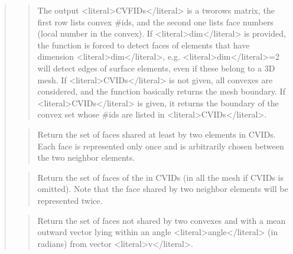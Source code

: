 \documentclass[a4paper,11pt,english]{sphinxmanual}
\begin{document}
\begin{quote}
\begin{quote}
\sphinxAtStartPar
The output \textless{}literal\textgreater{}CVFIDs\textless{}/literal\textgreater{} is a two\sphinxhyphen{}rows matrix, the first row lists
convex \#ids, and the second one lists face numbers (local number
in the convex). If \textless{}literal\textgreater{}dim\textless{}/literal\textgreater{} is provided, the function is forced to
detect faces of elements that have dimension \textless{}literal\textgreater{}dim\textless{}/literal\textgreater{}, e.g. \textless{}literal\textgreater{}dim\textless{}/literal\textgreater{}=2 will
detect edges of surface elements, even if these belong to a 3D mesh.
If \textless{}literal\textgreater{}CVIDs\textless{}/literal\textgreater{} is not given, all convexes are considered, and the
function basically returns the mesh boundary. If \textless{}literal\textgreater{}CVIDs\textless{}/literal\textgreater{}
is given, it returns the boundary of the convex set whose \#ids are
listed in \textless{}literal\textgreater{}CVIDs\textless{}/literal\textgreater{}.
\end{quote}

\sphinxAtStartPar
{}
\begin{quote}

\sphinxAtStartPar
Return the set of faces shared at least by two elements in CVIDs.
Each face is represented only once and is arbitrarily chosen
between the two neighbor elements.
\end{quote}

\sphinxAtStartPar
{}
\begin{quote}

\sphinxAtStartPar
Return the set of faces of the in CVIDs (in all the mesh if CVIDs is
omitted). Note that the face shared by two neighbor elements will be
represented twice.
\end{quote}

\sphinxAtStartPar
{}
\begin{quote}

\sphinxAtStartPar
Return the set of faces not shared by two convexes and with a mean outward vector lying within an angle \textless{}literal\textgreater{}angle\textless{}/literal\textgreater{} (in radians) from vector \textless{}literal\textgreater{}v\textless{}/literal\textgreater{}.


\end{quote}
\end{quote}
\end{document}
